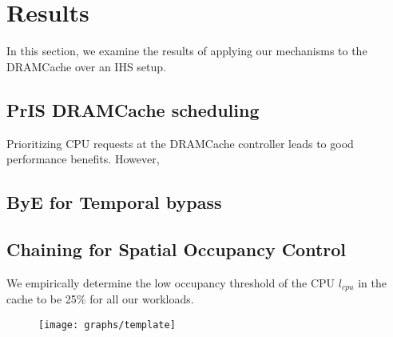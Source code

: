 \section{Results} \label{results}
In this section, we examine the results of applying our mechanisms to the DRAMCache over an IHS setup.
\subsection{PrIS DRAMCache scheduling}
Prioritizing CPU requests at the DRAMCache controller leads to good performance benefits. However, 
\subsection{ByE for Temporal bypass}

\subsection{Chaining for Spatial Occupancy Control}
We empirically determine the low occupancy threshold of the CPU \textit{$l_{cpu}$} in the cache to be 25\% for all our workloads.
\begin{figure}[htbp]
   \texttt{[image: graphs/template]}
   \label{fig:template}
\end{figure}
